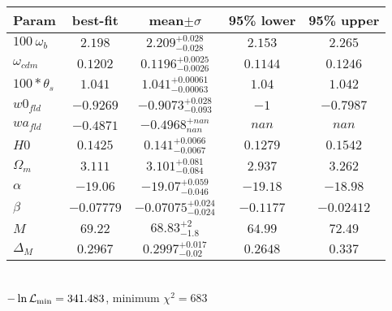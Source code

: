 

\begin{tabular}{|l|c|c|c|c|} 
 \hline 
Param & best-fit & mean$\pm\sigma$ & 95\% lower & 95\% upper \\ \hline 
$100~\omega_{b }$ &$2.198$ & $2.209_{-0.028}^{+0.028}$ & $2.153$ & $2.265$ \\ 
$\omega_{cdm }$ &$0.1202$ & $0.1196_{-0.0026}^{+0.0025}$ & $0.1144$ & $0.1246$ \\ 
$100*\theta_{s }$ &$1.041$ & $1.041_{-0.00063}^{+0.00061}$ & $1.04$ & $1.042$ \\ 
$w0_{fld }$ &$-0.9269$ & $-0.9073_{-0.093}^{+0.028}$ & $-1$ & $-0.7987$ \\ 
$wa_{fld }$ &$-0.4871$ & $-0.4968_{nan}^{+nan}$ & $nan$ & $nan$ \\ 
$H0$ &$0.1425$ & $0.141_{-0.0067}^{+0.0066}$ & $0.1279$ & $0.1542$ \\ 
$\Omega_{m }$ &$3.111$ & $3.101_{-0.084}^{+0.081}$ & $2.937$ & $3.262$ \\ 
$\alpha$ &$-19.06$ & $-19.07_{-0.046}^{+0.059}$ & $-19.18$ & $-18.98$ \\ 
$\beta$ &$-0.07779$ & $-0.07075_{-0.024}^{+0.024}$ & $-0.1177$ & $-0.02412$ \\ 
$M$ &$69.22$ & $68.83_{-1.8}^{+2}$ & $64.99$ & $72.49$ \\ 
$\Delta_{M }$ &$0.2967$ & $0.2997_{-0.02}^{+0.017}$ & $0.2648$ & $0.337$ \\ 
\hline 
 \end{tabular} \\ 
$-\ln{\cal L}_\mathrm{min} =341.483$, minimum $\chi^2=683$ \\ 

